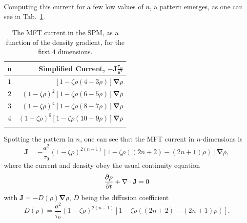 Computing this current for a few low values of $n$, a pattern emerges, as one can see in Tab.~\ref{tab:currents}.
\begin{table}  \caption[The dependence of MFT current upon dimension in the SPM.]{The MFT current in the SPM, as a function of the density gradient, for the first $4$ dimensions.} \label{tab:currents}
\begin{center}
\begin{tabular}{c | r} 
 n & Simplified Current, $\mathbf{-J \frac{\tau_0}{a^2}}$ \\
 \hline
 $1$  &  $\left[ 1 - \zeta \rho(4 - 3\rho) \right] \mathbf{\nabla} \rho$ \\
 $2$  &  $\left( 1 - \zeta \rho \right)^2 \left[ 1 - \zeta \rho(6 - 5\rho) \right] \mathbf{\nabla} \rho$ \\
 $3$  &  $\left( 1 - \zeta \rho \right)^4 \left[ 1 - \zeta \rho(8 - 7\rho) \right] \mathbf{\nabla} \rho$ \\
 $4$  &  $\left( 1 - \zeta \rho \right)^6 \left[ 1 - \zeta \rho(10 - 9\rho) \right] \mathbf{\nabla} \rho$ \\
 \\
\end{tabular}
\end{center}
\end{table}
Spotting the pattern in $n$, one can see that the MFT current in $n$-dimensions is
\begin{equation}
 \mathbf{J} = -\frac{a^2}{\tau_0}\left( 1 - \zeta \rho \right)^{2(n-1)} \left[ 1 - \zeta \rho\left( (2n+2) - (2n+1)\rho \right) \right] \mathbf{\nabla} \rho,
\end{equation}
where the current and density obey the usual continuity equation
\begin{equation}
 \frac{\partial \rho}{\partial t} + \mathbf{\nabla} \cdot \mathbf{J} = 0
\end{equation}
with $\mathbf{J} = - D(\rho) \mathbf{\nabla} \rho $, $D$ being the diffusion coefficient
\begin{equation} \label{eq:nDmftDiffCoeff}
 D(\rho) = \frac{a^2}{\tau_0}\left( 1 - \zeta \rho \right)^{2(n-1)} \left[ 1 - \zeta \rho\left( (2n+2) - (2n+1)\rho \right) \right].
\end{equation}


